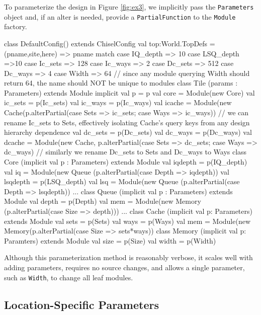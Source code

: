 \documentclass[10pt,twocolumn]{article}
\def\code#1{{\small\tt #1}}
\begin{document}
To parameterize the design in Figure \ref{fig:ex3}, we implicitly pass
the \code{Parameters} object and, if an alter is needed, provide a
\code{PartialFunction} to the \code{Module} factory.
\begin{scala}
class DefaultConfig() extends ChiselConfig {
  val top:World.TopDefs = {
    (pname,site,here) => pname match {
      case IQ_depth => 10
      case LSQ_depth =>10
      case Ic_sets => 128
      case Ic_ways => 2
      case Dc_sets => 512
      case Dc_ways => 4
      case Width => 64
      // since any module querying Width should return 64, the name should NOT be unique to modules
    }
  }
}
class Tile (params : Parameters) extends Module { 
  implicit val p = p
  val core = Module(new Core)
  val ic_sets = p(Ic_sets)
  val ic_ways = p(Ic_ways)
  val icache = Module(new Cache(p.alterPartial({case Sets => ic_sets; case Ways => ic_ways}))
  // we can rename Ic_sets to Sets, effectively isolating Cache's query keys from any design hierarchy dependence
  val dc_sets = p(Dc_sets)
  val dc_ways = p(Dc_ways)
  val dcache = Module(new Cache, p.alterPartial({case Sets => dc_sets; case Ways => dc_ways})
  // similarly we rename Dc_sets to Sets and Dc_ways to Ways
}
class Core (implicit val p : Parameters) extends Module {
  val iqdepth = p(IQ_depth)
  val iq = Module(new Queue (p.alterPartial({case Depth => iqdepth}))
  val lsqdepth = p(LSQ_depth)
  val lsq = Module(new Queue (p.alterPartial({case Depth => lsqdepth}))
  ...
}
class Queue (implicit val p : Parameters) extends Module {
  val depth = p(Depth)
  val mem = Module(new Memory (p.alterPartial({case Size => depth})))
  ...
}
class Cache (implicit val p: Parameters) extends Module {
  val sets = p(Sets)
  val ways = p(Ways)
  val mem = Module(new Memory(p.alterPartial({case Size => sets*ways}))
}
class Memory (implicit val p: Paramters) extends Module {
  val size = p(Size)
  val width = p(Width)
}
\end{scala}

Although this parameterization method is reasonably verbose, it scales well with adding parameters, requires no source changes, and allows a single parameter, such as \code{Width}, to change all leaf modules.

\subsection{Location-Specific Parameters}
\end{document}
